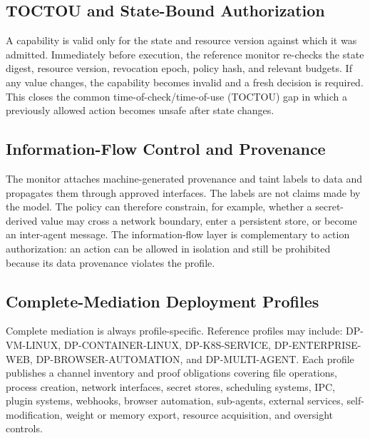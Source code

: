 \documentclass[11pt]{article}
\begin{document}
\subsection{TOCTOU and State-Bound Authorization}
A capability is valid only for the state and resource version against which it was admitted. Immediately before execution, the reference monitor re-checks the state digest, resource version, revocation epoch, policy hash, and relevant budgets. If any value changes, the capability becomes invalid and a fresh decision is required. This closes the common time-of-check/time-of-use (TOCTOU) gap in which a previously allowed action becomes unsafe after state changes.

\subsection{Information-Flow Control and Provenance}
The monitor attaches machine-generated provenance and taint labels to data and propagates them through approved interfaces. The labels are not claims made by the model. The policy can therefore constrain, for example, whether a secret-derived value may cross a network boundary, enter a persistent store, or become an inter-agent message. The information-flow layer is complementary to action authorization: an action can be allowed in isolation and still be prohibited because its data provenance violates the profile.

\subsection{Complete-Mediation Deployment Profiles}\label{sec:profiles}
Complete mediation is always profile-specific. Reference profiles may include: DP-VM-LINUX, DP-CONTAINER-LINUX, DP-K8S-SERVICE, DP-ENTERPRISE-WEB, DP-BROWSER-AUTOMATION, and DP-MULTI-AGENT. Each profile publishes a channel inventory and proof obligations covering file operations, process creation, network interfaces, secret stores, scheduling systems, IPC, plugin systems, webhooks, browser automation, sub-agents, external services, self-modification, weight or memory export, resource acquisition, and oversight controls.
\end{document}
